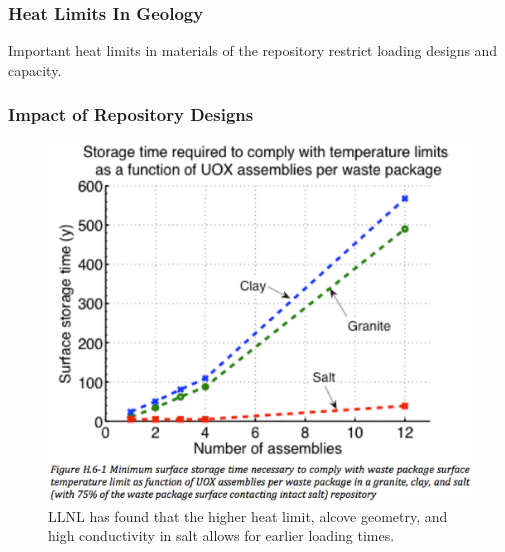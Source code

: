 

\begin{frame}[ctb!]
  \frametitle{Heat Limits In Geology}
  Important heat limits in materials of the repository restrict loading designs 
  and capacity.
  
\end{frame}

\begin{frame}[ctb!]
  \frametitle{Impact of Repository Designs}
   
   \begin{figure}[h!]
     \begin{center}
       \includegraphics[height=.5\textheight]{./images/llnlGeos.eps}
     \end{center}
     \caption{LLNL has found that the higher heat limit, alcove geometry, and 
     high conductivity in salt allows for earlier loading times.}
     \label{fig:llnlGeos}
   \end{figure}
\end{frame}

